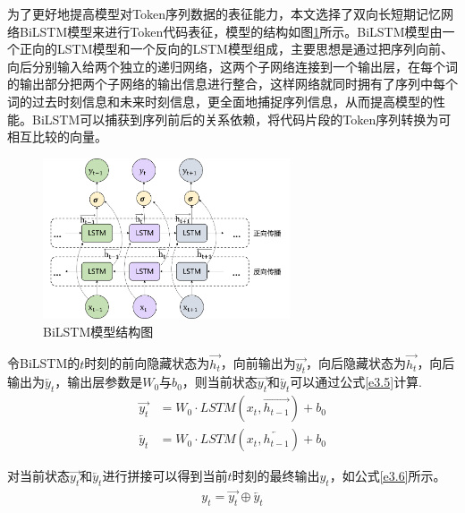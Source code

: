 为了更好地提高模型对Token序列数据的表征能力，本文选择了双向长短期记忆网络BiLSTM模型来进行Token代码表征，模型的结构如图\ref{fig:BiLSTM}所示。BiLSTM模型由一个正向的LSTM模型和一个反向的LSTM模型组成，主要思想是通过把序列向前、向后分别输入给两个独立的递归网络，这两个子网络连接到一个输出层，在每个词的输出部分把两个子网络的输出信息进行整合，这样网络就同时拥有了序列中每个词的过去时刻信息和未来时刻信息，更全面地捕捉序列信息，从而提高模型的性能。BiLSTM可以捕获到序列前后的关系依赖，将代码片段的Token序列转换为可相互比较的向量。
\begin{figure}[H] 
  \centering
  \includegraphics[width=0.65\textwidth]{figures/BiLSTM}
  \caption{BiLSTM模型结构图}\label{fig:BiLSTM}
\end{figure}

令BiLSTM的$t$时刻的前向隐藏状态为$\overrightarrow{h_t}$，向前输出为$\overrightarrow{y_t}$，向后隐藏状态为$\overrightarrow{h_t}$，向后输出为$\overleftarrow{y_t}$，输出层参数是$W_0$与$b_0$，则当前状态$\overrightarrow{y_t}$和$\overleftarrow{y_t}$可以通过公式\ref{e3.5}计算.
\begin{equation}\label{e3.5}
  \begin{split}
    \overrightarrow{y_t} &= W_0 \cdot LSTM\left(x_{t},\overrightarrow{h_{t-1}}\right) + b_0
    \\
    \overleftarrow{y_t} &= W_0 \cdot LSTM\left(x_{t},\overleftarrow{h_{t-1}}\right) + b_0
  \end{split}
\end{equation}

对当前状态$\overrightarrow{y_t}$和$\overleftarrow{y_t}$进行拼接可以得到当前$t$时刻的最终输出$y_t$，如公式\ref{e3.6}所示。
\begin{equation}\label{e3.6}
  \begin{split}
    y_t = \overrightarrow{y_t} \oplus\overleftarrow{y_t}
  \end{split}
\end{equation}

